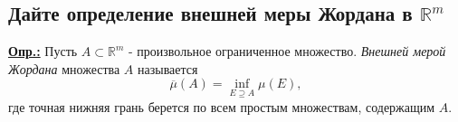 
\subsection{Дайте определение внешней меры Жордана в $\mathbb{R}^m$}

\textbf{\underline{Опр.:} } Пусть $A \subset \mathbb{R}^m$ - произвольное ограниченное множество. \textit{Внешней мерой Жордана} множества $A$ называется
$$\overline{\mu}(A) = \inf\limits_{E\supseteq A}\mu(E),$$
где точная нижняя грань берется по всем простым множествам, содержащим $A$.



